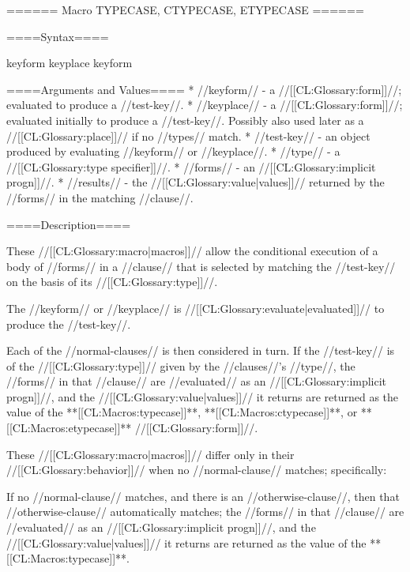 ====== Macro TYPECASE, CTYPECASE, ETYPECASE ======

====Syntax====

 {keyform  } {}  {keyplace } {}  {keyform } {}

   

====Arguments and Values====
  * //keyform// - a //[[CL:Glossary:form]]//; evaluated to produce a //test-key//.
  * //keyplace// - a //[[CL:Glossary:form]]//; evaluated initially to produce a //test-key//. Possibly also used later as a //[[CL:Glossary:place]]// if no //types// match.
  * //test-key// - an object produced by evaluating //keyform// or //keyplace//.
  * //type// - a //[[CL:Glossary:type specifier]]//.
  * //forms// - an //[[CL:Glossary:implicit progn]]//.
  * //results// - the //[[CL:Glossary:value|values]]// returned by the //forms// in the matching //clause//.

====Description====

These //[[CL:Glossary:macro|macros]]// allow the conditional execution of a body of //forms// in a //clause// that is selected by matching the //test-key// on the basis of its //[[CL:Glossary:type]]//.

The //keyform// or //keyplace// is //[[CL:Glossary:evaluate|evaluated]]// to produce the //test-key//.

Each of the //normal-clauses// is then considered in turn. If the //test-key// is of the //[[CL:Glossary:type]]// given by the //clauses//'s //type//, the //forms// in that //clause// are //evaluated// as an //[[CL:Glossary:implicit progn]]//, and the //[[CL:Glossary:value|values]]// it returns are returned as the value of the **[[CL:Macros:typecase]]**, **[[CL:Macros:ctypecase]]**, or **[[CL:Macros:etypecase]]** //[[CL:Glossary:form]]//.

These //[[CL:Glossary:macro|macros]]// differ only in their //[[CL:Glossary:behavior]]// when no //normal-clause// matches; specifically:

\beginlist


If no //normal-clause// matches, and there is an //otherwise-clause//, then that //otherwise-clause// automatically matches; the //forms// in that //clause// are //evaluated// as an //[[CL:Glossary:implicit progn]]//, and the //[[CL:Glossary:value|values]]// it returns are returned as the value of the **[[CL:Macros:typecase]]**.

